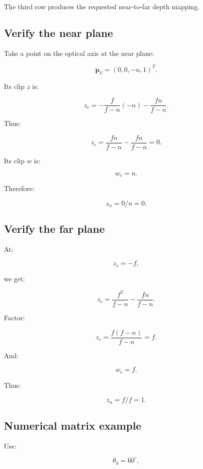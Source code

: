 The third row produces the requested near-to-far depth mapping.

\subsection{Verify the near plane}\label{02-foundations-ii-ch033-verify-the-near-plane}

\hypertarget{02-foundations-ii-ch033-verify-the-near-plane}{}

Take a point on the optical axis at the near plane:

\[
 \mathbf p_V=(0,0,-n,1)^T.
\]

Its clip \(z\) is:

\[
 z_c= -\frac f{f-n}(-n)-\frac{fn}{f-n}.
\]

Thus:

\[
 z_c= \frac{fn}{f-n}-\frac{fn}{f-n}=0.
\]

Its clip \(w\) is:

\[
 w_c=n.
\]

Therefore:

\[
 \boxed{z_n=0/n=0}.
\]

\subsection{Verify the far plane}\label{02-foundations-ii-ch033-verify-the-far-plane}

\hypertarget{02-foundations-ii-ch033-verify-the-far-plane}{}

At:

\[
 z_v=-f,
\]

we get:

\[
 z_c= \frac{f^2}{f-n}-\frac{fn}{f-n}.
\]

Factor:

\[
 z_c= \frac{f(f-n)}{f-n}=f.
\]

And:

\[
 w_c=f.
\]

Thus:

\[
 \boxed{z_n=f/f=1}.
\]

\subsection{Numerical matrix example}\label{02-foundations-ii-ch033-numerical-matrix-example}

\hypertarget{02-foundations-ii-ch033-numerical-matrix-example}{}

Use:

\[
 \theta_y=60^\circ,
\]


